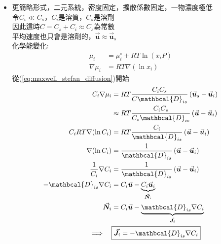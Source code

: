 \documentclass[../main.tex]{subfiles}
\begin{document}
\begin{itemize}
\begin{itemize}
\begin{align}
      \rho_A \vec{\bm u} -  D_{AB} \nabla \rho_A
    \right) - r_A &= 0 \nonumber\\
    \frac{\partial \omega_A}{\partial t} + \rho_A \cancelto{0}{\nabla \cdot \vec{\bm u}} 
    + \vec{\bm u} \cdot \nabla \rho_A -D_{AB} \nabla^2 \rho_A - r_A &=0 \nonumber\\
    (\div M_A)\implies \quad \boxed{\frac{\partial C_A}{\partial t} 
    + \vec{\bm u} \cdot \nabla C_A - D_{AB} \nabla^2 C_A - R_A} &=0\label{eq:mass_transport_simplified }
  \end{align}
  \item 更簡略形式，二元系統，密度固定，擴散係數固定，一物濃度極低\\
  令$C_i\ll C_s$，$C_i$是溶質，$C_s$是溶劑\\
  因此這時$C=C_s + C_i \approx C_s$為常數\\
  平均速度也只會是溶劑的，$\vec{\bm u} \approx \vec{\bm u}_s$\\
  化學能變化:
  \begin{align}
    \mu_i &= \mu_i^\circ + RT \ln (x_i P) \nonumber\\
    \nabla \mu_i &= RT \nabla (\ln x_i )
  \end{align}
  從(\ref{eq:maxwell_stefan_diffusion})開始
  \begin{align}
    C_i \nabla \mu_i &= RT\frac{C_i C_s}{C \mathbcal{D}_{is}} \left(
       \vec{\bm u}_s - \vec{\bm u}_i
    \right) \nonumber\\
    &\approx RT \frac{C_i C_s}{C_s \mathbcal{D}_{is}} \left(
       \vec{\bm u} - \vec{\bm u}_i
    \right) \nonumber\\
    C_i RT\nabla (\ln C_i) &= RT \frac{C_i}{\mathbcal{D}_{is}} \left(
       \vec{\bm u} - \vec{\bm u}_i
    \right) \nonumber\\
    \nabla (\ln C_i) &= \frac{1}{\mathbcal{D}_{is}} \left(
       \vec{\bm u} - \vec{\bm u}_i
    \right) \nonumber\\
    \frac{1}{C_i}\nabla C_i &= \frac{1}{\mathbcal{D}_{is}} \left(
       \vec{\bm u} - \vec{\bm u}_i
    \right) \nonumber\\
    -\mathbcal{D}_{is} \nabla C_i &= C_i\vec{\bm u} - \underbrace{C_i \vec{\bm u}_i}_{\vec{\bm N}_i} \nonumber\\
    \vec{\bm N}_i &= C_i \vec{\bm u} - \underbrace{\mathbcal{D}_{is} \nabla C_i}_{\vec{\bm J}_i} \nonumber\\
    \implies \quad &\boxed{\vec{\bm J}_i = -\mathbcal{D}_{is} \nabla C_i} \label{eq:ficks_law_dilute_solution}
  \end{align}

\end{itemize}
\end{itemize}
\end{document}
